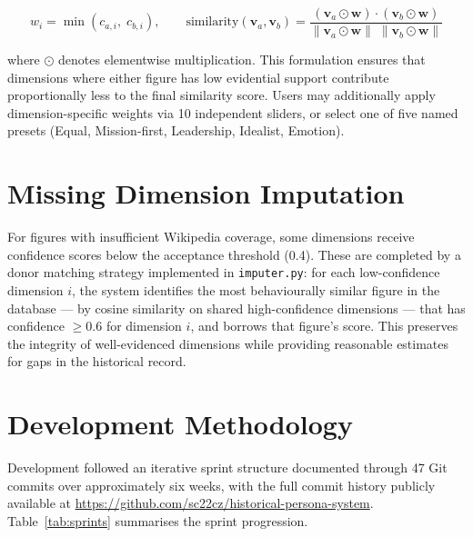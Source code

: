 \documentclass[11pt, a4paper]{report}
\begin{document}
\begin{equation}
  \label{eq:similarity}
  w_i = \min(c_{a,i},\; c_{b,i}), \qquad
  \text{similarity}(\mathbf{v}_a, \mathbf{v}_b) = \frac{(\mathbf{v}_a \odot \mathbf{w}) \cdot (\mathbf{v}_b \odot \mathbf{w})}{\|\mathbf{v}_a \odot \mathbf{w}\|\;\|\mathbf{v}_b \odot \mathbf{w}\|}
\end{equation}

where $\odot$ denotes elementwise multiplication. This formulation ensures that dimensions where either figure has low evidential support contribute proportionally less to the final similarity score. Users may additionally apply dimension-specific weights via 10 independent sliders, or select one of five named presets (Equal, Mission-first, Leadership, Idealist, Emotion).

\section{Missing Dimension Imputation}

For figures with insufficient Wikipedia coverage, some dimensions receive confidence scores below the acceptance threshold (0.4). These are completed by a donor matching strategy implemented in \texttt{imputer.py}: for each low-confidence dimension $i$, the system identifies the most behaviourally similar figure in the database — by cosine similarity on shared high-confidence dimensions — that has confidence $\geq 0.6$ for dimension $i$, and borrows that figure's score. This preserves the integrity of well-evidenced dimensions while providing reasonable estimates for gaps in the historical record.

\section{Development Methodology}

Development followed an iterative sprint structure documented through 47 Git commits over approximately six weeks, with the full commit history publicly available at \url{https://github.com/sc22cz/historical-persona-system}. Table~\ref{tab:sprints} summarises the sprint progression.
\end{document}

